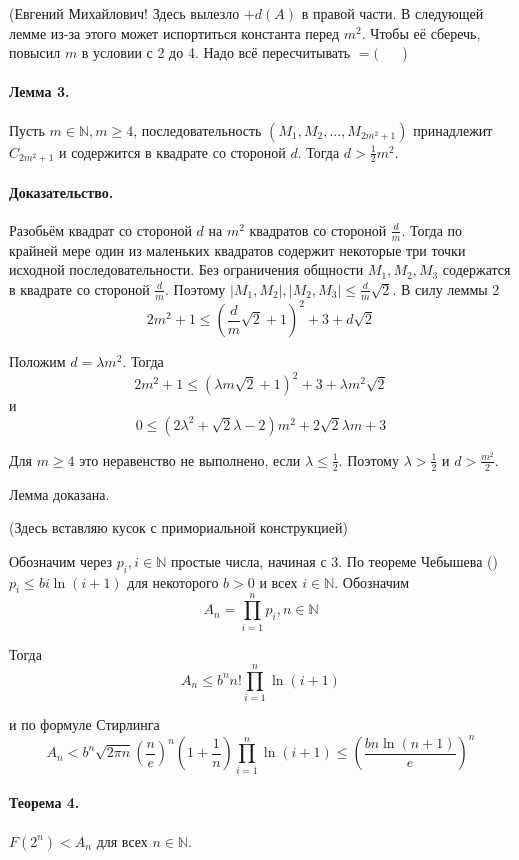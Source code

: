 \documentclass[a4paper,14pt]{article} %
\begin{document}
(Евгений Михайлович! Здесь вылезло $+d(A)$ в правой части.
В следующей лемме из-за этого может испортиться константа перед $m^2$.
Чтобы её сберечь, повысил $m$ в условии с 2 до 4.
Надо всё пересчитывать $=($ ~~ )

\paragraph{Лемма 3.}
Пусть $m\in\mathbb{N}, m\geq 4$, последовательность $(M_1,M_2,...,M_{2m^2+1})$ принадлежит $C_{2m^2+1}$ и содержится в квадрате со стороной $d$.
Тогда $d>\frac{1}{2}m^2$.

\paragraph{Доказательство.} Разобьём квадрат со стороной $d$ на $m^2$ квадратов со стороной $\frac{d}{m}$.
Тогда по крайней мере один из маленьких квадратов содержит некоторые три точки исходной последовательности.
Без ограничения общности $M_1,M_2,M_3$ содержатся в квадрате со стороной $\frac{d}{m}$.
Поэтому $|M_1,M_2|,|M_2,M_3| \leq \frac{d}{m}\sqrt{2}$.
В силу леммы 2
$$
2m^2+1 \leq\left(\frac{d}{m}\sqrt{2}+1\right)^2+3+d\sqrt{2}
$$

Положим $d=\lambda m^2$.
Тогда
$$
2m^2+1 \leq \left(\lambda m \sqrt2 + 1 \right)^2 + 3 + \lambda m^2 \sqrt2
$$
и
$$
0\leq \left( 2\lambda^2 + \sqrt2 \lambda - 2 \right)m^2 + 2\sqrt2 \lambda m + 3
$$

Для $m\geq 4$ это неравенство не выполнено, если $\lambda \leq \frac{1}{2}$.
Поэтому $\lambda > \frac{1}{2}$ и $d>\frac{m^2}{2}$.

Лемма доказана.

(Здесь вставляю кусок с примориальной конструкцией)


Обозначим через $p_i, i\in\mathbb{N}$ простые числа, начиная с 3.
По теореме Чебышева (\cite{Buhshtab}) $p_i \leq bi\ln(i+1)$ для некоторого $b>0$ и всех $i\in\mathbb{N}$.
Обозначим
$$
A_n=\prod_{i=1}^{n} p_i, n\in\mathbb{N}
$$

Тогда
$$
A_n\leq b^n n! \prod_{i=1}^{n} \ln(i+1)
$$

и по формуле Стирлинга
\begin{equation*}\label{ocenka_Stirling}
A_n <
b^n \sqrt{2\pi n} \left(\frac{n}{e}\right)^n \left(1+\frac{1}{n}\right) \prod_{i=1}^{n} \ln(i+1)
\leq \left(\frac{bn\ln (n+1)}{e}\right)^n
\end{equation*}


\paragraph{Теорема 4.}
$F(2^n)<A_n$ для всех $n\in\mathbb{N}$.
\end{document}
